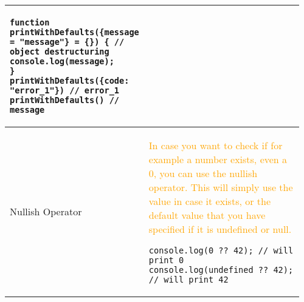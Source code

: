 \documentclass[main.tex,fontsize=8pt,paper=a4,paper=portrait,DIV=calc,]{scrartcl}
\begin{document}
\begin{table}[ht!]
\begin{tabular}{|m{0.2\linewidth}|m{0.755\linewidth}|}
\begin{lstlisting}
function printWithDefaults({message = "message"} = {}) { // object destructuring
console.log(message);
}
printWithDefaults({code: "error_1"}) // error_1
printWithDefaults() // message
\end{lstlisting}\\
\hline
Nullish Operator & 
\textcolor{orange}{In case you want to check if for example a number exists, even a 0, you can use the nullish operator.\newline
This will simply use the value in case it exists, or the default value that you have specified if it is undefined or null.}\newline
\begin{lstlisting}
console.log(0 ?? 42); // will print 0 
console.log(undefined ?? 42); // will print 42
\end{lstlisting}\\
\hline
\end{tabular}
\end{table}
\pagebreak
\end{document}
